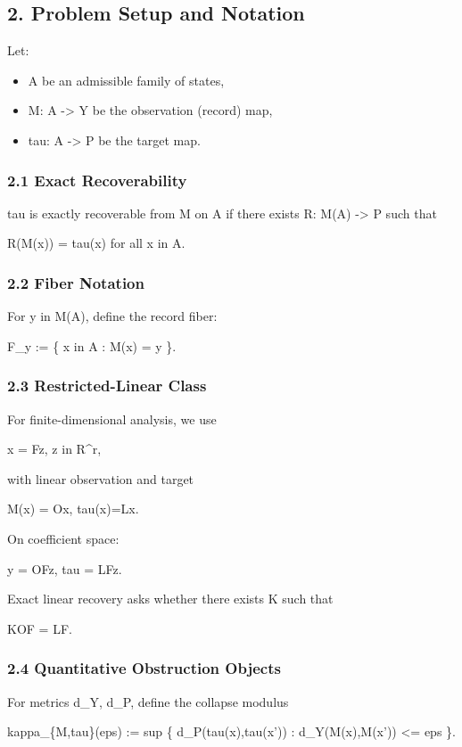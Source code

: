 \documentclass[11pt]{article}
\begin{document}
\subsection*{2. Problem Setup and Notation}
Let:

\begin{itemize}
\item A be an admissible family of states,
\item M: A -> Y be the observation (record) map,
\item tau: A -> P be the target map.
\end{itemize}

\subsubsection*{2.1 Exact Recoverability}
tau is exactly recoverable from M on A if there exists R: M(A) -> P such that


R(M(x)) = tau(x) for all x in A.


\subsubsection*{2.2 Fiber Notation}
For y in M(A), define the record fiber:


F\_y := \{ x in A : M(x) = y \}.


\subsubsection*{2.3 Restricted-Linear Class}
For finite-dimensional analysis, we use


x = Fz, z in R\textasciicircum{}r,


with linear observation and target


M(x) = Ox, tau(x)=Lx.


On coefficient space:


y = OFz, tau = LFz.


Exact linear recovery asks whether there exists K such that


KOF = LF.


\subsubsection*{2.4 Quantitative Obstruction Objects}
For metrics d\_Y, d\_P, define the collapse modulus


kappa\_\{M,tau\}(eps) := sup \{ d\_P(tau(x),tau(x')) : d\_Y(M(x),M(x')) <= eps \}.
\end{document}
